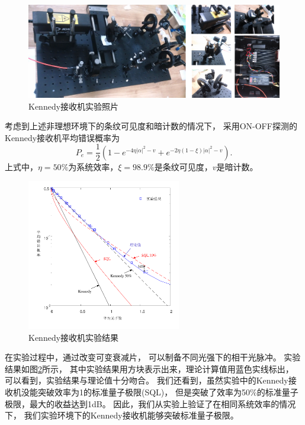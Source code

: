 \begin{figure}
\centering
  \includegraphics[width=\textwidth]{figures/chap5/experiment-photo}
  \caption{Kennedy接收机实验照片}
  \label{fig:experiment-photo}
\end{figure}

考虑到上述非理想环境下的条纹可见度和暗计数的情况下，
采用ON-OFF探测的Kennedy接收机平均错误概率为
\begin{equation}
P_e = \frac{1}{2}(1-e^{- 4 \eta |\alpha|^2 - v} + e^{- 2 \eta (1-\xi) |\alpha|^2 - v }).
\end{equation}
上式中，$\eta=50\%$为系统效率，$\xi=98.9\%$是条纹可见度，$v$是暗计数。

\begin{figure}[H]
\centering
  \includegraphics[width=0.6\textwidth]{figures/chap5/kennedy-experiment-error}
  \caption{Kennedy接收机实验结果}
  \label{fig:kennedy-experiment-error}
\end{figure}


在实验过程中，通过改变可变衰减片，
可以制备不同光强下的相干光脉冲。
实验结果如图\ref{fig:kennedy-experiment-error}所示，
其中实验结果用方块表示出来，理论计算值用蓝色实线标出，
可以看到，实验结果与理论值十分吻合。
我们还看到，虽然实验中的Kennedy接收机没能突破效率为1的标准量子极限(SQL)，
但是突破了效率为50\%的标准量子极限，最大的收益达到1dB。
因此，我们从实验上验证了在相同系统效率的情况下，
我们实验环境下的Kennedy接收机能够突破标准量子极限。


